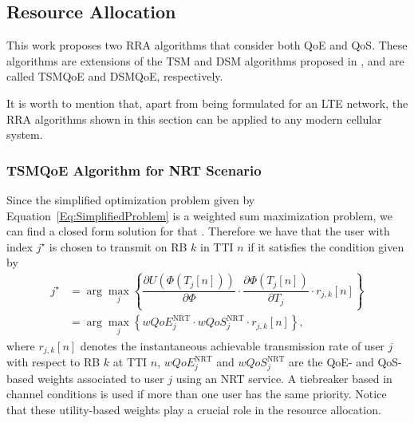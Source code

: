\documentclass[12pt]{article}
\newcommand{\SecRef}[1]{Section~\ref{#1}}
\newcommand{\EqRef}[1]{Equation~\ref{#1}}
\newcommand{\AppRef}[1]{Appendix~\ref{#1}}
\begin{document}

\subsection{Resource Allocation}
\label{Sec:resource}
This work proposes two \ac{RRA} algorithms that consider both \ac{QoE} and \ac{QoS}. These algorithms are extensions of the \ac{TSM} and \ac{DSM} algorithms proposed in \cite{Rodrigues2014_Wiley}, and are called TSMQoE and DSMQoE, respectively.

It is worth to mention that, apart from being formulated for an \ac{LTE} network, the \ac{RRA} algorithms shown in this section can be applied to any modern cellular system.

\subsubsection{TSMQoE Algorithm for NRT Scenario}
Since the simplified optimization problem given by \EqRef{Eq:SimplifiedProblem} is a weighted sum maximization problem, we can find a closed form solution for that \cite{Art:Song2005_p2,Proc:Hosein2002}. Therefore we have that the user with index $j^\star$ is chosen to transmit on \ac{RB} $k$ in \ac{TTI} $n$ if it satisfies the condition given by
%
\begin{equation}
\label{Eq:argmaxTSMQoE}
\begin{split}
j^{\star} &= \arg\max_{j} \left\{\dfrac{\partial U\left(\Phi\left(T_j[n]\right)\right)}{\partial \Phi} \cdot \dfrac{\partial \Phi\left(T_j[n]\right)}{\partial {T_j}} \cdot r_{j,k}\left[n\right]\right\} \\&= \arg\max_{j} \left\{wQoE_{j}^{\text{NRT}}\cdot wQoS_{j}^{\text{NRT}} \cdot r_{j,k}\left[n\right]\right\},
\end{split}
\end{equation}
%	
where $r_{j,k}[n]$ denotes the instantaneous achievable transmission rate of user $ j $ with respect to \ac{RB} $k$ at \ac{TTI} $n$, $wQoE_{j}^{\text{NRT}}$ and $wQoS_{j}^{\text{NRT}}$ are the QoE- and QoS-based weights associated to user $j$ using an NRT service. A tiebreaker based in channel conditions is used if more than one user has the same priority. Notice that these utility-based weights play a crucial role in the resource allocation. 
\end{document}
